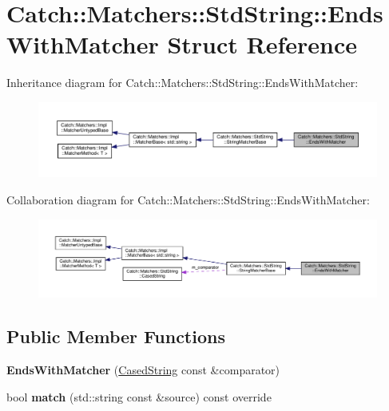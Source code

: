 \hypertarget{structCatch_1_1Matchers_1_1StdString_1_1EndsWithMatcher}{}\section{Catch\+::Matchers\+::Std\+String\+::Ends\+With\+Matcher Struct Reference}
\label{structCatch_1_1Matchers_1_1StdString_1_1EndsWithMatcher}


Inheritance diagram for Catch\+::Matchers\+::Std\+String\+::Ends\+With\+Matcher\+:
\nopagebreak
\begin{figure}[H]
\begin{center}
\leavevmode
\includegraphics[width=350pt]{structCatch_1_1Matchers_1_1StdString_1_1EndsWithMatcher__inherit__graph}
\end{center}
\end{figure}


Collaboration diagram for Catch\+::Matchers\+::Std\+String\+::Ends\+With\+Matcher\+:
\nopagebreak
\begin{figure}[H]
\begin{center}
\leavevmode
\includegraphics[width=350pt]{structCatch_1_1Matchers_1_1StdString_1_1EndsWithMatcher__coll__graph}
\end{center}
\end{figure}
\subsection*{Public Member Functions}
\begin{DoxyCompactItemize}
\item 
\mbox{\label{structCatch_1_1Matchers_1_1StdString_1_1EndsWithMatcher_aa5ec700b4629562f74f362080accfd7b}} 
{\bfseries Ends\+With\+Matcher} (\mbox{\hyperlink{structCatch_1_1Matchers_1_1StdString_1_1CasedString}{Cased\+String}} const \&comparator)
\item 
\mbox{\label{structCatch_1_1Matchers_1_1StdString_1_1EndsWithMatcher_aca2741fa57374a2a98d2a84ac3e13a6d}} 
bool {\bfseries match} (std\+::string const \&source) const override
\end{DoxyCompactItemize}
